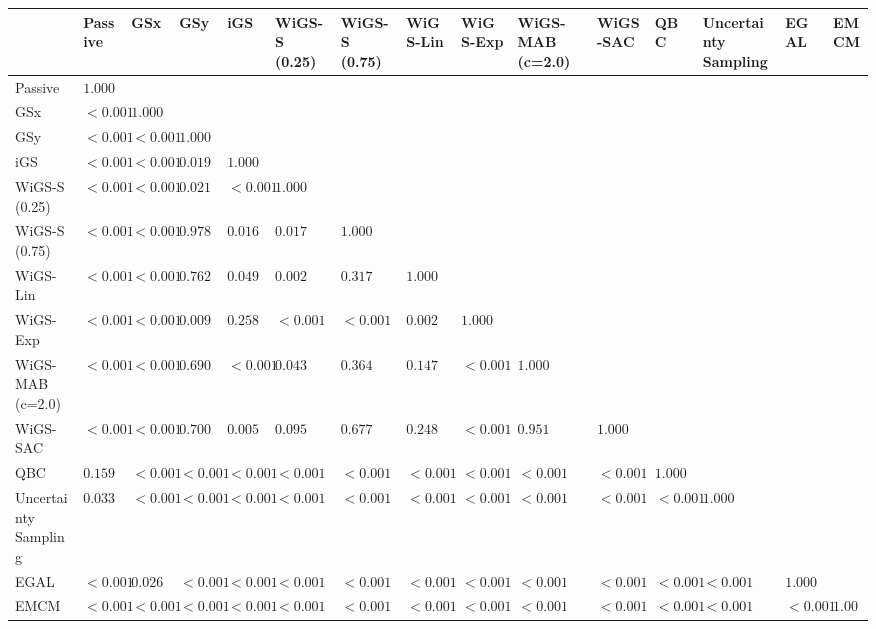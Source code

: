\begin{tabular}{lllllllllllllll}
\toprule
 & Passive & GSx & GSy & iGS & WiGS-S (0.25) & WiGS-S (0.75) & WiGS-Lin & WiGS-Exp & WiGS-MAB (c=2.0) & WiGS-SAC & QBC & Uncertainty Sampling & EGAL & EMCM \\
\midrule
Passive & $1.000$ &  &  &  &  &  &  &  &  &  &  &  &  &  \\
GSx & $<0.001$ & $1.000$ &  &  &  &  &  &  &  &  &  &  &  &  \\
GSy & $<0.001$ & $<0.001$ & $1.000$ &  &  &  &  &  &  &  &  &  &  &  \\
iGS & $<0.001$ & $<0.001$ & $0.019$ & $1.000$ &  &  &  &  &  &  &  &  &  &  \\
WiGS-S (0.25) & $<0.001$ & $<0.001$ & $0.021$ & $<0.001$ & $1.000$ &  &  &  &  &  &  &  &  &  \\
WiGS-S (0.75) & $<0.001$ & $<0.001$ & $0.978$ & $0.016$ & $0.017$ & $1.000$ &  &  &  &  &  &  &  &  \\
WiGS-Lin & $<0.001$ & $<0.001$ & $0.762$ & $0.049$ & $0.002$ & $0.317$ & $1.000$ &  &  &  &  &  &  &  \\
WiGS-Exp & $<0.001$ & $<0.001$ & $0.009$ & $0.258$ & $<0.001$ & $<0.001$ & $0.002$ & $1.000$ &  &  &  &  &  &  \\
WiGS-MAB (c=2.0) & $<0.001$ & $<0.001$ & $0.690$ & $<0.001$ & $0.043$ & $0.364$ & $0.147$ & $<0.001$ & $1.000$ &  &  &  &  &  \\
WiGS-SAC & $<0.001$ & $<0.001$ & $0.700$ & $0.005$ & $0.095$ & $0.677$ & $0.248$ & $<0.001$ & $0.951$ & $1.000$ &  &  &  &  \\
QBC & $0.159$ & $<0.001$ & $<0.001$ & $<0.001$ & $<0.001$ & $<0.001$ & $<0.001$ & $<0.001$ & $<0.001$ & $<0.001$ & $1.000$ &  &  &  \\
Uncertainty Sampling & $0.033$ & $<0.001$ & $<0.001$ & $<0.001$ & $<0.001$ & $<0.001$ & $<0.001$ & $<0.001$ & $<0.001$ & $<0.001$ & $<0.001$ & $1.000$ &  &  \\
EGAL & $<0.001$ & $0.026$ & $<0.001$ & $<0.001$ & $<0.001$ & $<0.001$ & $<0.001$ & $<0.001$ & $<0.001$ & $<0.001$ & $<0.001$ & $<0.001$ & $1.000$ &  \\
EMCM & $<0.001$ & $<0.001$ & $<0.001$ & $<0.001$ & $<0.001$ & $<0.001$ & $<0.001$ & $<0.001$ & $<0.001$ & $<0.001$ & $<0.001$ & $<0.001$ & $<0.001$ & $1.000$ \\
\bottomrule
\end{tabular}
